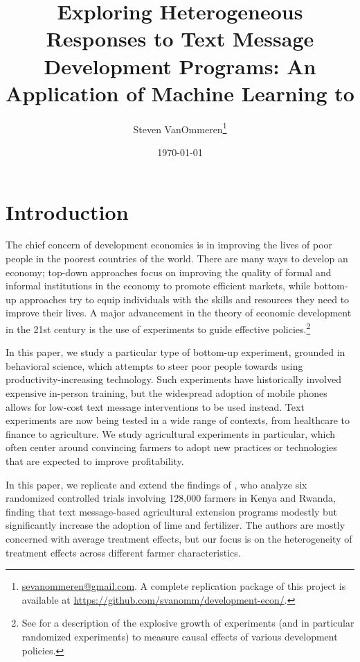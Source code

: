 \documentclass[12pt]{article}
\begin{document}
\title{Exploring Heterogeneous Responses to Text Message Development Programs: An Application of Machine Learning to \textcite{fabregas_digital_2025}}
\author{Steven VanOmmeren\thanks{\href{mailto:sevanommeren@gmail.com}{sevanommeren@gmail.com}. A complete replication package of this project is available at \url{https://github.com/svanomm/development-econ/}.}}
\date{\today}
\maketitle
\noindent
\tableofcontents
\newpage

\doublespacing

\section{Introduction}

The chief concern of development economics is in improving the lives of poor people in the poorest countries of the world. There are many ways to develop an economy; top-down approaches focus on improving the quality of formal and informal institutions in the economy to promote efficient markets, while bottom-up approaches try to equip individuals with the skills and resources they need to improve their lives. A major advancement in the theory of economic development in the 21st century is the use of experiments to guide effective policies.\footnote{See \textcite{basu_influence_2020} for a description of the explosive growth of experiments (and in particular randomized experiments) to measure causal effects of various development policies.} 

In this paper, we study a particular type of bottom-up experiment, grounded in behavioral science, which attempts to steer poor people towards using productivity-increasing technology. Such experiments have historically involved expensive in-person training, but the widespread adoption of mobile phones allows for low-cost text message interventions to be used instead. Text experiments are now being tested in a wide range of contexts, from healthcare to finance to agriculture. We study agricultural experiments in particular, which often center around convincing farmers to adopt new practices or technologies that are expected to improve profitability.

In this paper, we replicate and extend the findings of \textcite{fabregas_digital_2025}, who analyze six randomized controlled trials involving 128,000 farmers in Kenya and Rwanda, finding that text message-based agricultural extension programs modestly but significantly increase the adoption of lime and fertilizer. The authors are mostly concerned with average treatment effects, but our focus is on the heterogeneity of treatment effects across different farmer characteristics.
\end{document}
